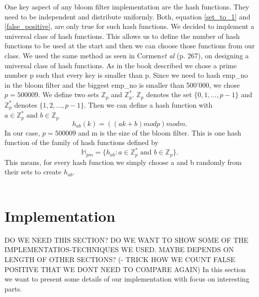 \documentclass[12]{scrartcl}
\begin{document}
One key aspect of any bloom filter implementation are the hash functions. They need to be independent and distribute uniformly. Both, equation \ref{set_to_1} and \ref{false_positive}, are only true for such hash functions. We decided to implement a universal class of hash functions. This allows us to define the number of hash functions to be used at the start and then we can choose those functions from our class. We used the same method as seen in Cormen{\em et al}\cite{cormen} (p. 267), on designing a universal class of hash functions. As in the book described we chose a prime number p such that every key is smaller than p. Since we need to hash emp\_no in the bloom filter and the biggest emp\_no is smaller than 500'000, we chose $p = 500009$. We define two sets $\mathbb{Z}_p$ and $\mathbb{Z}_p^*$. $\mathbb{Z}_p$ denotes the set $\{0,1,...,p-1\}$ and $\mathbb{Z}_p^*$ denotes $\{1,2,...,p-1\}$. Then we can define a hash function with $a \in \mathbb{Z}_p^* \text{ and } b \in \mathbb{Z}_p$
\begin{equation}
	h_{ab}(k) = ((ak + b) \mathrel{mod} p) \mathrel{mod} m.
\end{equation}
In our case, $p = 500009$ and m is the size of the bloom filter. This is one hash function of the family of hash functions defined by
\begin{equation}
\mathbb{H}_{pm} = \{h_{ab} \mathrel{:} a \in \mathbb{Z}_p^* \text{ and } b \in \mathbb{Z}_p\}.
\end{equation}
This means, for every hash function we simply choose a and b randomly from their sets to create $h_{ab}$.\\\\

\section{Implementation}
DO WE NEED THIS SECTION? DO WE WANT TO SHOW SOME OF THE IMPLEMENTATIOS-TECHNIQUES WE USED. MAYBE DEPENDS ON LENGTH OF OTHER SECTIONS? (- TRICK HOW WE COUNT FALSE POSITIVE THAT WE DONT NEED TO COMPARE AGAIN)
In this section we want to present some details of our implementation with focus on interesting parts.
\end{document}
